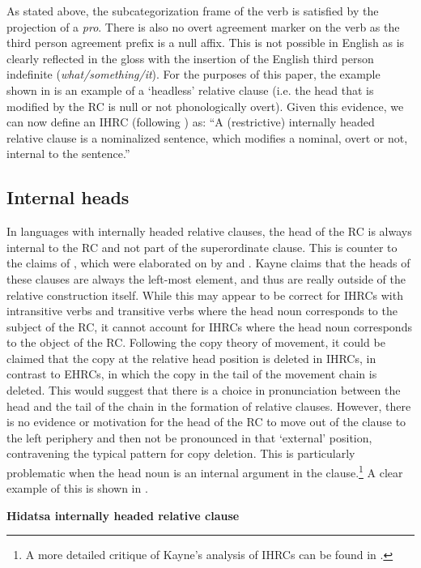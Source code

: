 \documentclass[output=paper]{LSP/langsci}
\begin{document}
As stated above, the subcategorization frame of the verb is satisfied by the projection of a \textit{pro}. There is also no overt agreement marker on the verb as the third person agreement prefix is a null affix. This is not possible in English as is clearly reflected in the gloss with the insertion of the English third person indefinite (\textit{what/something/it}). For the purposes of this paper, the example shown in  is an example of a `headless' relative clause (i.e. the head that is modified by the RC is null or not phonologically overt). Given this evidence, we can now define an IHRC (following \citealt[27]{Culy1990}) as: ``A (restrictive) internally headed relative clause is a nominalized sentence, which modifies a nominal, overt or not, internal to the sentence.'' 

\subsection{Internal heads}\label{sec:boyle:3.1}

In languages with internally headed relative clauses, the head of the RC is always internal to the RC and not part of the superordinate clause. This is counter to the claims of \citet{Kayne1994}, which were elaborated on by \citet{Bianchi1999} and \citet{DiSciullo2005}. Kayne claims that the heads of these clauses are always the left-most element, and thus are really outside of the relative construction itself.  While this may appear to be correct for IHRCs with intransitive verbs and transitive verbs where the head noun corresponds to the subject of the RC, it cannot account for IHRCs where the head noun corresponds to the object of the RC. Following the copy theory of movement, it could be claimed that the copy at the relative head position is deleted in IHRCs, in contrast to EHRCs, in which the copy in the tail of the movement chain is deleted. This would suggest that there is a choice in pronunciation between the head and the tail of the chain in the formation of relative clauses. However, there is no evidence or motivation for the head of the RC to move out of the clause to the left periphery and then not be pronounced in that `external' position, contravening the typical pattern for copy deletion. This is particularly problematic when the head noun is an internal argument in the clause.\footnote{A more detailed critique of Kayne's analysis of IHRCs can be found in \citet{Boyle2007}.}  A clear example of this is shown in .

\ea \textbf{Hidatsa internally headed relative clause} \label{boyle11}
\end{document}

